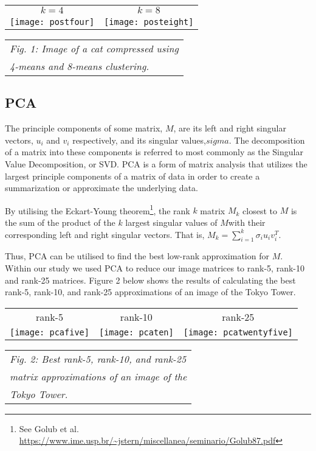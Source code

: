 \documentclass[letterpaper, 12 pt, conference]{ieeeconf}  %
\begin{document}
\vspace*{3mm}
\begin{tabular}{c c}
	$k=4$ & $k=8$ \\
	\texttt{[image: postfour]} &
		\texttt{[image: posteight]} \\
\end{tabular}
\begin{tabular}{l}
	{\it \hspace*{4mm} Fig. 1: Image of a cat compressed using} \\
	{\it \hspace*{4mm} 4-means and 8-means clustering.}
\end{tabular}

\subsection{PCA}
The principle components of some matrix, $M$, are its left and right singular vectors, $u_i$ and $v_i$ respectively, and its singular values,$sigma$. The decomposition of a matrix into these components is referred to most commonly as the Singular Value Decomposition, or SVD.
PCA is a form of matrix analysis that utilizes the largest principle components of a matrix of data in order to create a summarization or approximate the underlying data.

By utilising the Eckart-Young theorem\footnote{See Golub et al. \url{https://www.ime.usp.br/~jstern/miscellanea/seminario/Golub87.pdf}}, the rank $k$ matrix $M_k$ closest to $M$ is the sum of the product of the $k$ largest singular values of $M$with their corresponding left and right singular vectors. That is, $M_k = \sum_{i=1}^k \sigma_i u_i v_i^T$.

Thus, PCA can be utilised to find the best low-rank approximation for $M$.
Within our study we used PCA to reduce our image matrices to rank-5, rank-10
and rank-25 matrices. Figure 2 below shows the results of calculating the best rank-5, rank-10,
and rank-25 approximations of an image of the Tokyo Tower.

\vspace*{3mm}
\begin{tabular}{c c c}
	rank-5 & rank-10 & rank-25 \\
	\texttt{[image: pcafive]} &
		\texttt{[image: pcaten]} &
		\texttt{[image: pcatwentyfive]} \\
\end{tabular}
\begin{tabular}{l}
	{\it \hspace*{4mm} Fig. 2: Best rank-5, rank-10, and rank-25} \\
	{\it \hspace*{4mm} matrix approximations of an image of the} \\
	{\it \hspace*{4mm} Tokyo Tower.} \\
\end{tabular}
\end{document}
